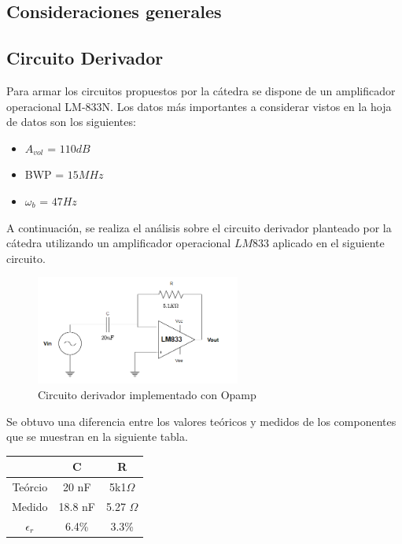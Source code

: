 \subsection{Consideraciones generales}
 

\subsection{Circuito Derivador}
Para armar los circuitos propuestos por la cátedra se dispone de un
amplificador operacional LM-833N. Los datos más importantes a considerar
vistos en la hoja de datos son los siguientes:
\begin{itemize}
    \item $A_{vol}$ = $110dB$ 
    \item BWP = $15 MHz$
    \item $\omega_b$ = $47 Hz$
\end{itemize}   

A continuación, se realiza el análisis sobre el circuito derivador planteado
por la cátedra utilizando un amplificador operacional $LM833$ aplicado en el siguiente circuito.
\begin{figure}[H]
    \centering
    \includegraphics[width=0.6\textwidth]{../Ejercicio3-CircuitoIntegradoresyDerivadores/Imagenes/Derivador/circuito_derivador.png}
    \caption{Circuito derivador implementado con Opamp}
\end{figure}
Se obtuvo una diferencia entre los valores teóricos y medidos de los componentes 
que se muestran en la siguiente tabla.
\begin{table}[H]
    \centering
    \begin{tabular}{|c|c|c|}
    \hline
                 & C       & R             \\ \hline
    Teórcio      & 20 nF   & 5k1$\Omega$   \\ \hline
    Medido       & 18.8 nF & 5.27 $\Omega$ \\ \hline
    $\epsilon_r$ & 6.4\%    & 3.3\%          \\ \hline
    \end{tabular}
    \end{table}


